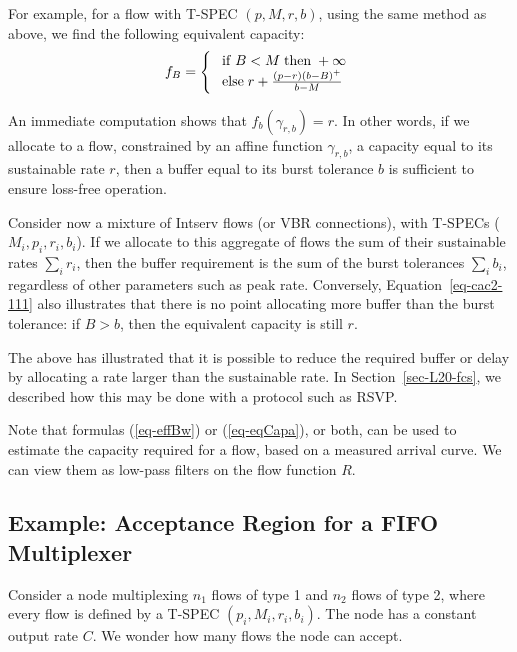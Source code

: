 For example, for a flow with T-SPEC $(p,M,r,b)$, using the same
method as above, we find the following equivalent capacity:
\begin{equation}
    f_{B} = \bracket{
    \mif B < M \mthen +\infty\\
    \melse r + \frac{(p-r)(b-B)^+}{b-M}
    }
    \mylabel{eq-cac2-111}
\end{equation}

An immediate computation shows that $f_b(\gamma_{r,b})=r$. In
other words, if we allocate to a flow, constrained by an affine
function $\gamma_{r,b}$, a capacity equal to its sustainable rate
$r$, then a buffer equal to its burst tolerance $b$ is sufficient
to ensure loss-free operation.

Consider now a mixture of Intserv flows (or VBR connections), with
T-SPECs ($M_i, p_i, r_i, b_i$). If we allocate to this aggregate
of flows the sum of their sustainable rates $\sum_i r_i$, then the
buffer requirement is the sum of the burst tolerances $\sum_i
b_i$, regardless of other parameters such as peak rate.
Conversely, Equation~\ref{eq-cac2-111} also illustrates that there
is no point allocating more buffer than the burst tolerance: if
$B>b$, then the equivalent capacity is still $r$.

The above has illustrated that it is possible to reduce the
required buffer or delay by allocating a rate larger than the
sustainable rate. In Section~\ref{sec-L20-fcs}, we described how
this may be done with a protocol such as RSVP.

Note that formulas (\ref{eq-effBw}) or (\ref{eq-eqCapa}), or both,
can be used to estimate the capacity required for a flow, based on
a measured arrival curve. We can view them as low-pass filters on
the flow function $R$.

\subsection{Example: Acceptance Region for a FIFO Multiplexer}

Consider a node multiplexing $n_1$ flows of type 1 and $n_2$ flows
of type 2, where every flow is defined by a T-SPEC $(p_i, M_i,
r_i, b_i)$. The node has a constant output rate $C$. We wonder how
many flows the node can accept.


